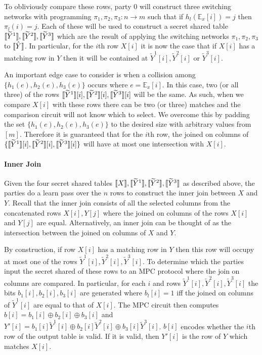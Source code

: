 To obliviously compare these rows, party 0 will construct three switching networks with programming $\pi_1,\pi_2,\pi_3 : n\rightarrow m$ such that if $h_l(\mathbb{E}_x[i])=j$ then $\pi_l(i)=j$. Each of these will be used to construct a secret shared table $\llbracket \widetilde{Y}^1\rrbracket,\llbracket \widetilde{Y}^2\rrbracket,\llbracket \widetilde{Y}^3\rrbracket$ which are the result of applying the switching networks $\pi_1,\pi_2,\pi_3$ to $\llbracket \hat Y\rrbracket$. In particular, for the $i$th row $X[i]$ it is now the case that if $X[i]$ has a matching row in $Y$ then it will be contained at  $\widetilde{Y}^1[i],\widetilde{Y}^2[i]$ or ${\widetilde{Y}^3}[i]$. 

An important edge case to consider is when a collision among $\{h_1(e),h_2(e), h_3(e)\}$ occurs where $e= \mathbb{E}_x[i]$. In this case, two (or all three) of the rows $\llbracket \widetilde{Y}^1\rrbracket[i],\llbracket \widetilde{Y}^2\rrbracket[i],\llbracket \widetilde{Y}^3\rrbracket[i]$ will be the same. As such, when we compare $X[i]$ with these rows there can be two (or three) matches and the comparison circuit will not know which to select. We overcome this by padding the set $\{h_1(e),h_2(e), h_3(e)\}$ to the desired size with arbitrary values from $[m]$. Therefore it is guaranteed that for the $i$th row, the joined on columns of $\{\llbracket \widetilde{Y}^1\rrbracket[i],\llbracket \widetilde{Y}^2\rrbracket[i],\llbracket \widetilde{Y}^3\rrbracket[i]\}$ will  have at most one intersection with $X[i]$.


\paragraph{Inner Join}

Given the four secret shared tables $\llbracket X\rrbracket,\llbracket \widetilde{Y}^1\rrbracket,\llbracket \widetilde{Y}^2\rrbracket,\llbracket \widetilde{Y}^3\rrbracket$ as described above, the parties do a learn pass over the $n$ rows to construct the inner join between $X$ and $Y$. Recall that the inner join consists of all the selected columns from the concatenated rows $X[i],Y[j]$ where  the joined on columns of the rows $X[i]$ and $Y[j]$ are equal. Alternatively, an inner join can be thought of as the intersection between the joined on columns of $X$ and $Y$. 

By construction, if row $X[i]$ has a matching row in $Y$ then this row will occupy at most one of the rows ${\widetilde{Y}^1}[i],{\widetilde{Y}^2}[i],{\widetilde{Y}^3}[i]$. To determine which the parties input the secret shared of these rows to an MPC protocol where the join on columns are compared. In particular, for each $i$ and rows ${\widetilde{Y}^1}[i],{\widetilde{Y}^2}[i],{\widetilde{Y}^3}[i]$ the bits $b_1[i],b_2[i],b_3[i]$ are generated where $b_l[i]=1$ iff the joined on columns of ${\widetilde{Y}^1}[i]$ are equal to that of $X[i]$. The MPC circuit then computes $b[i]=b_1[i]\oplus b_2[i]\oplus b_3[i]$ and $Y'[i]=b_1[i]{\widetilde{Y}^1}[i]\oplus b_2[i]{\widetilde{Y}^2}[i]\oplus b_3[i]{\widetilde{Y}^3}[i]$. $b[i]$ encodes whether the $i$th row of the output table is valid. If it is valid, then $Y'[i]$ is the row of $Y$ which matches $X[i]$.

